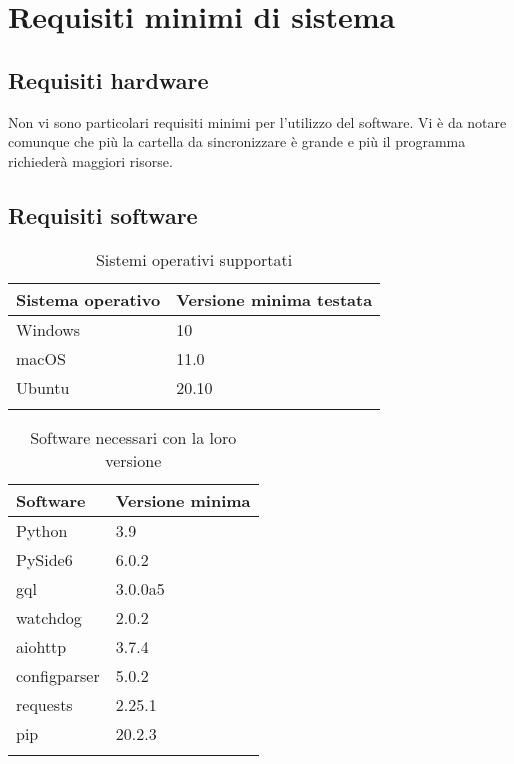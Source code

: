 \section{Requisiti minimi di sistema}

\subsection{Requisiti hardware}

Non vi sono particolari requisiti minimi per l'utilizzo del software. Vi è da notare comunque che più la cartella da sincronizzare è grande e più il programma richiederà maggiori risorse.

\subsection{Requisiti software}
{
	\setlength{\freewidth}{\dimexpr\textwidth-1\tabcolsep}
	\renewcommand{\arraystretch}{1.5}
	\setlength{\aboverulesep}{0pt}
	\setlength{\belowrulesep}{0pt}
	\begin{longtable}{L{.210\freewidth} C{.68\freewidth}}
		\textbf{Sistema operativo} & \textbf{Versione minima testata} \\
		\toprule
		\endhead
		Windows & 10 \\
		macOS & 11.0 \\
		Ubuntu & 20.10 \\

		\bottomrule
		\hiderowcolors
		\caption{Sistemi operativi supportati}
	\end{longtable}
}
{
	\setlength{\freewidth}{\dimexpr\textwidth-1\tabcolsep}
	\renewcommand{\arraystretch}{1.5}
	\setlength{\aboverulesep}{0pt}
	\setlength{\belowrulesep}{0pt}
	\begin{longtable}{L{.210\freewidth} L{.68\freewidth}}
		\textbf{Software} & \textbf{Versione minima} \\
		\toprule
		\endhead
		Python & 3.9 \\
		PySide6 & 6.0.2 \\
		gql & 3.0.0a5 \\
		watchdog & 2.0.2 \\
		aiohttp & 3.7.4 \\
		configparser & 5.0.2 \\
		requests & 2.25.1 \\
		pip & 20.2.3 \\
		\bottomrule
		\hiderowcolors
		\caption{Software necessari con la loro versione}
	\end{longtable}
}


